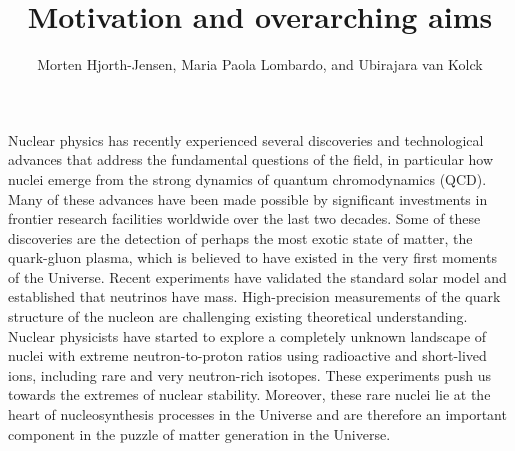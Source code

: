 \title{Motivation and overarching aims}
\author{Morten Hjorth-Jensen, Maria Paola Lombardo, and Ubirajara van Kolck}
\maketitle





Nuclear physics has recently experienced several discoveries and
technological advances that address the fundamental questions of the
field, in particular how nuclei emerge from the strong dynamics
of quantum chromodynamics (QCD).
Many of these advances have been made possible by significant
investments in frontier research facilities worldwide over the last
two decades. Some of these discoveries are the detection of perhaps
the most exotic state of matter, the quark-gluon plasma, which is
believed to have existed in the very first moments of the Universe.  
Recent experiments have validated the standard solar model
and established that neutrinos have mass. High-precision
measurements of the quark structure of the nucleon are challenging
existing theoretical understanding.  Nuclear physicists have started
to explore a completely unknown landscape of nuclei with extreme
neutron-to-proton ratios using radioactive and short-lived ions,
including rare and very neutron-rich isotopes.  These experiments push
us towards the extremes of nuclear stability.  Moreover, these rare
nuclei lie at the heart of nucleosynthesis processes in the Universe
and are therefore an important component in the puzzle of matter
generation in the Universe.

